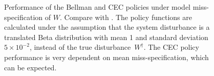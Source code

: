 \documentclass[main.tex]{subfiles}
\begin{document}
\begin{figure}[htbp]
\begin{subfigure}[b]{0.5\textwidth}
  \end{subfigure}
  \caption{Performance of the Bellman and CEC policies under model
    miss-specification of
    $W$. Compare with .
    The policy functions are calculated under the assumption that
    the system disturbance is a translated Beta distribution with mean 1
    and standard deviation $5\times 10^{-2}$,
    instead
    of the true disturbance~$W^\dagger$.
    The CEC policy performance is very dependent on mean miss-specification,
    which can be expected.
  }\label{fig:markdown_bellman_mpc_model_misspecification}
\end{figure}
\end{document}
